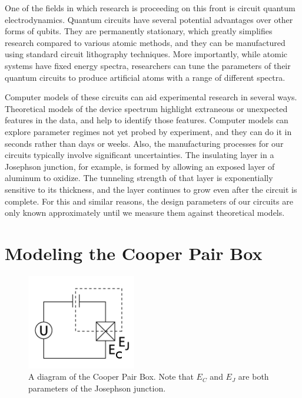 \documentclass[twocolumn]{revtex4}
\begin{document}
One of the fields in which research is proceeding on this front is
circuit quantum electrodynamics\cite{Blais}\cite{Wallraff}. Quantum
circuits have several potential advantages over other forms of
qubits. They are permanently stationary, which greatly simplifies
research compared to various atomic methods, and they can be
manufactured using standard circuit lithography techniques. More
importantly, while atomic systems have fixed energy spectra,
researchers can tune the parameters of their quantum circuits to
produce artificial atoms with a range of different spectra.

Computer models of these circuits can aid experimental research in
several ways. Theoretical models of the device spectrum highlight
extraneous or unexpected features in the data, and help to identify
those features. Computer models can explore parameter regimes not yet
probed by experiment, and they can do it in seconds rather than days
or weeks. Also, the manufacturing processes for our circuits typically
involve significant uncertainties. The insulating layer in a Josephson
junction, for example, is formed by allowing an exposed layer of
aluminum to oxidize. The tunneling strength of that layer is
exponentially sensitive to its thickness, and the layer continues to
grow even after the circuit is complete. For this and similar reasons,
the design parameters of our circuits are only known approximately
until we measure them against theoretical models.

\section{Modeling the Cooper Pair Box}

\begin{figure}
  \includegraphics[width=.5\linewidth]{CPB-circuit.png}
  \caption{A diagram of the Cooper Pair Box. Note that $E_C$ and $E_J$
    are both parameters of the Josephson junction.}
  \label{cpb-circuit}
\end{figure}
\end{document}
